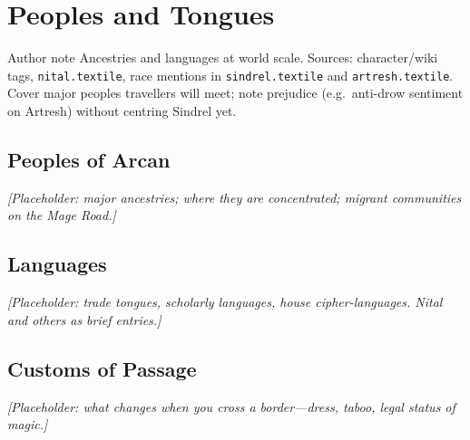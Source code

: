 \chapter{Peoples and Tongues}

\begin{DndComment}{Author note}
  Ancestries and languages at world scale. Sources: character/wiki tags, \texttt{nital.textile}, race mentions in \texttt{sindrel.textile} and \texttt{artresh.textile}.
  Cover major peoples travellers will meet; note prejudice (e.g.\ anti-drow sentiment on Artresh) without centring Sindrel yet.
\end{DndComment}

\section{Peoples of Arcan}

\textit{[Placeholder: major ancestries; where they are concentrated; migrant communities on the Mage Road.]}

\section{Languages}

\textit{[Placeholder: trade tongues, scholarly languages, house cipher-languages. Nital and others as brief entries.]}

\section{Customs of Passage}

\textit{[Placeholder: what changes when you cross a border---dress, taboo, legal status of magic.]}
